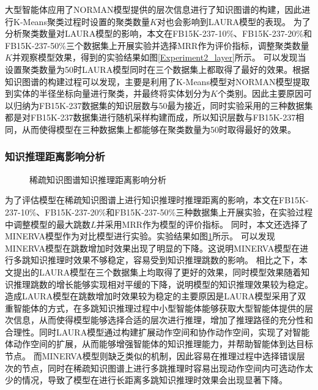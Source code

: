 \documentclass[algorithmlist, AutoFakeBold, AutoFakeSlant, figurelist, tablelist, nomlist, engineering]{seuthesix}
\begin{document}
大型智能体应用了NORMAN模型提供的层次信息进行了知识图谱的构建，因此进行K-Means聚类过程时设置的聚类数量$K$对也会影响到LAURA模型的表现。
为了分析聚类数量对LAURA模型的影响，本文在FB15K-237-10\%、FB15K-237-20\%和FB15K-237-50\%三个数据集上开展实验并选择MRR作为评价指标，调整聚类数量$K$并观察模型效果，得到的实验结果如图\ref{Experiment2_layer}所示。
可以发现当设置聚类数量为50时LAURA模型同时在三个数据集上都取得了最好的效果。根据知识图谱的构建过程可以发现，主要是利用了K-Means模型对NORMAN模型提取到实体的半径坐标向量进行聚类，并最终将实体划分为$K$个类别。因此主要原因可以归纳为FB15K-237数据集的知识层数与50最为接近，同时实验采用的三种数据集都是对FB15K-237数据集进行随机采样构建而成，所以知识层数与FB15K-237相同，从而使得模型在三种数据集上都能够在聚类数量为50时取得最好的效果。

\subsubsection{知识推理距离影响分析}
\begin{figure}[t]
  \centering
  \caption{稀疏知识图谱知识推理距离影响分析}
  \label{Experiment2_multihop}
\end{figure}

为了评估模型在稀疏知识图谱上进行知识推理时推理距离的影响，本文在FB15K-237-10\%、FB15K-237-20\%和FB15K-237-50\%三种数据集上开展实验，在实验过程中调整模型的最大跳数$L$并采用MRR作为模型的评价指标。
同时，本文还选择了MINERVA模型作为对比模型进行实验。实验结果如图\ref{Experiment2_multihop}所示。
可以发现MINERVA模型在跳数增加时效果出现了明显的下降。这说明MINERVA模型在进行多跳知识推理时效果不够稳定，容易受到知识推理跳数的影响。
相比之下，本文提出的LAURA模型在三个数据集上均取得了更好的效果，同时模型效果随着知识推理跳数的增长能够实现相对平缓的下降，说明模型的知识推理效果较为稳定。
造成LAURA模型在跳数增加时效果较为稳定的主要原因是LAURA模型采用了双重智能体的方式，在多跳知识推理过程中小型智能体能够获取大型智能体提供的层次信息，从而使得模型能够选择合适的层次进行推理，增加了推理路径的充分性和合理性。同时LAURA模型通过构建扩展动作空间和协作动作空间，实现了对智能体动作空间的扩展，从而能够增强智能体的知识推理能力，并帮助智能体到达目标节点。
而MINERVA模型则缺乏类似的机制，因此容易在推理过程中选择错误层次的节点，同时在稀疏知识图谱上进行多跳推理时容易出现动作空间内可选动作太少的情况，导致了模型在进行长距离多跳知识推理时效果会出现显著下降。
\end{document}
